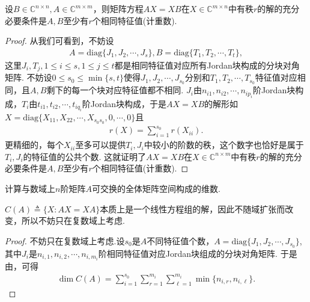 \documentclass[../../main.tex]{subfiles}
\begin{document}
\begin{corollary}\label{corollary:AX-XB相关命题1}
设$B\in\mathbb{C}^{n\times n}, A\in\mathbb{C}^{m\times m}$，则矩阵方程$AX = XB$在$X\in\mathbb{C}^{m\times n}$中有秩$r$的解的充分必要条件是$A,B$至少有$r$个相同特征值(计重数).
\end{corollary}
\begin{proof}
从我们可看到，不妨设
\begin{align*}
A = \mathrm{diag}\{J_1, J_2, \cdots, J_s\}, B = \mathrm{diag}\{T_1, T_2, \cdots, T_t\},
\end{align*}
这里$J_i, T_j, 1\leqslant i\leqslant s, 1\leqslant j\leqslant t$都是相同特征值对应所有Jordan块构成的分块对角矩阵. 不妨设$0\leqslant s_0\leqslant\min\{s, t\}$使得$J_1, J_2, \cdots, J_{s_0}$分别和$T_1, T_2, \cdots, T_{s_0}$特征值对应相同，且$A,B$剩下的每一个块对应特征值都不相同. $J_i$由$n_{i1}, n_{i2}, \cdots, n_{ip_i}$阶Jordan块构成，$T_i$由$t_{i1}, t_{i2}, \cdots, t_{iq_i}$阶Jordan块构成，于是$AX = XB$的解形如$X = \mathrm{diag}\{X_{11}, X_{22}, \cdots, X_{s_0s_0}, 0, \cdots, 0\}$且
\begin{align*}
r(X) = \sum_{i = 1}^{s_0}r(X_{ii}).
\end{align*}
更精细的，每个$X_{ii}$至多可以提供$T_i, J_i$中较小的阶数的秩，这个数字也恰好是属于$T_i, J_i$的特征值的公共个数. 这就证明了$AX = XB$在$X\in\mathbb{C}^{n\times m}$中有秩$r$的解的充分必要条件是$A,B$至少有$r$个相同特征值(计重数). 
\end{proof}

\begin{corollary}\label{corollary:AX-XB相关命题3}
计算与数域上$n$阶矩阵$A$可交换的全体矩阵空间构成的维数. 
\end{corollary}
\begin{note}
$C(A)\triangleq\{X: AX = XA\}$本质上是一个线性方程组的解，因此不随域扩张而改变，所以不妨只在复数域上考虑.
\end{note}
\begin{proof}
不妨只在复数域上考虑.设$s_0$是$A$不同特征值个数，$A = \mathrm{diag}\{J_1, J_2, \cdots, J_{s_0}\}$,其中$J_i$是$n_{i,1},n_{i,2},\cdots,n_{i,m_i}$阶相同特征值对应Jordan块组成的分块对角矩阵.
于是由，可得
\begin{align*}
\dim C(A) = \sum_{i = 1}^{s_0}\sum_{r = 1}^{m_i}\sum_{\ell = 1}^{m_i}\min\{n_{i,r}, n_{i,\ell}\}.
\end{align*}
\end{proof}
\end{document}
